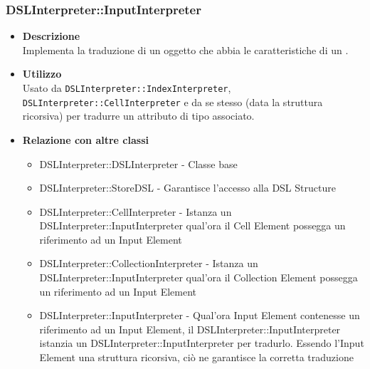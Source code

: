 \subsubsection{DSLInterpreter::InputInterpreter}
\begin{itemize}
\item \textbf{Descrizione} \hfill \\
  Implementa la traduzione di un oggetto che abbia le caratteristiche di un .
\item \textbf{Utilizzo} \hfill \\
  Usato da \texttt{DSLInterpreter::IndexInterpreter}, \texttt{DSLInterpreter::CellInterpreter} e da se stesso (data la struttura ricorsiva) per tradurre un attributo di tipo  associato.
\item \textbf{Relazione con altre classi}
  \begin{itemize}
  \item DSLInterpreter::DSLInterpreter - Classe base
  \item DSLInterpreter::StoreDSL - Garantisce l'accesso alla DSL Structure
  \item DSLInterpreter::CellInterpreter - Istanza un DSLInterpreter::InputInterpreter qual'ora il Cell Element possegga un riferimento ad un Input Element
  \item DSLInterpreter::CollectionInterpreter - Istanza un DSLInterpreter::InputInterpreter qual'ora il Collection Element possegga un riferimento ad un Input Element
  \item DSLInterpreter::InputInterpreter - Qual'ora Input Element contenesse un riferimento ad un Input Element, il DSLInterpreter::InputInterpreter istanzia un DSLInterpreter::InputInterpreter per tradurlo. Essendo l'Input Element una struttura ricorsiva, ciò ne garantisce la corretta traduzione
  \end{itemize}
\end{itemize}
